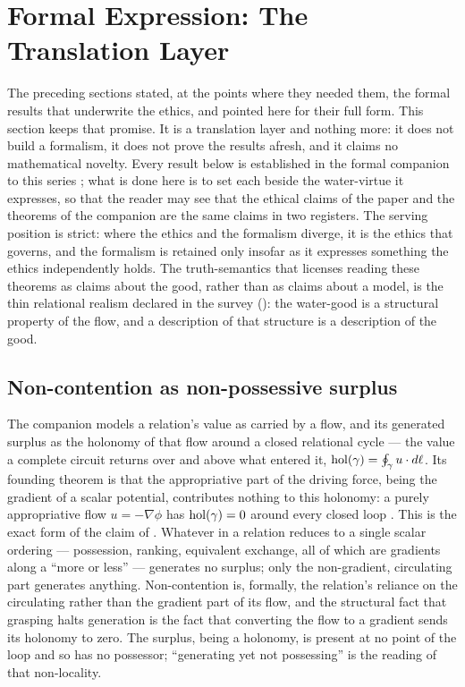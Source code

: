 \section{Formal Expression: The Translation Layer}
\label{p20:sec:formal}

\noindent
The preceding sections stated, at the points where they needed them, the formal results that underwrite the ethics, and pointed here for their full form. This section keeps that promise. It is a translation layer and nothing more: it does not build a formalism, it does not prove the results afresh, and it claims no mathematical novelty. Every result below is established in the formal companion to this series \parencite{wan2026braid}; what is done here is to set each beside the water-virtue it expresses, so that the reader may see that the ethical claims of the paper and the theorems of the companion are the same claims in two registers. The serving position is strict: where the ethics and the formalism diverge, it is the ethics that governs, and the formalism is retained only insofar as it expresses something the ethics independently holds. The truth-semantics that licenses reading these theorems as claims about the good, rather than as claims about a model, is the thin relational realism declared in the survey (): the water-good is a structural property of the flow, and a description of that structure is a description of the good.

\subsection{Non-contention as non-possessive surplus}
\label{p20:sub:formal-noncon}

The companion models a relation's value as carried by a flow, and its generated surplus as the holonomy of that flow around a closed relational cycle --- the value a complete circuit returns over and above what entered it, $\operatorname{hol}(\gamma) = \oint_\gamma u \cdot d\ell$. Its founding theorem is that the appropriative part of the driving force, being the gradient of a scalar potential, contributes nothing to this holonomy: a purely appropriative flow $u = -\nabla\phi$ has $\operatorname{hol}(\gamma) = 0$ around every closed loop \parencite{wan2026braid}. This is the exact form of the claim of . Whatever in a relation reduces to a single scalar ordering --- possession, ranking, equivalent exchange, all of which are gradients along a ``more or less'' --- generates no surplus; only the non-gradient, circulating part generates anything. Non-contention is, formally, the relation's reliance on the circulating rather than the gradient part of its flow, and the structural fact that grasping halts generation is the fact that converting the flow to a gradient sends its holonomy to zero. The surplus, being a holonomy, is present at no point of the loop and so has no possessor; ``generating yet not possessing'' is the reading of that non-locality.

